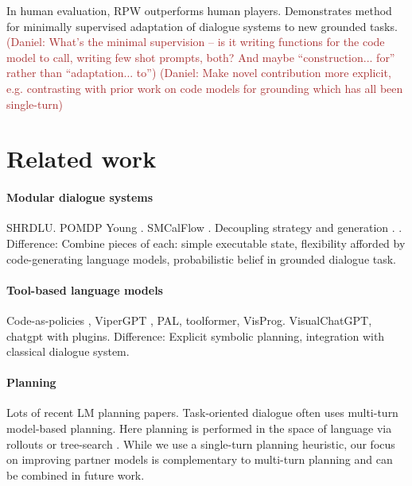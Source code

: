 \documentclass[11pt]{article}
\newcommand{\system}{RPW}
\newcommand{\daniel}[1]{{{\textcolor{brown}{(Daniel: #1)}}}}
\begin{document}
In human evaluation, \system{} outperforms human players.
Demonstrates method for minimally supervised adaptation of dialogue systems to new grounded tasks.
\daniel{What's the minimal supervision -- is it writing functions for the code model to call, writing few shot prompts, both? And maybe ``construction... for'' rather than ``adaptation... to''}
\daniel{Make novel contribution more explicit, e.g. contrasting with prior work on code models for grounding which has all been single-turn}

\section{Related work}

\paragraph{Modular dialogue systems}
SHRDLU. POMDP Young \citep{young2006pomdp}. SMCalFlow \citep{sm}.
Decoupling strategy and generation \citep{he2018dnd}. \citep{fstod}.
Difference: Combine pieces of each: simple executable state,
flexibility afforded by code-generating language models,
probabilistic belief in grounded dialogue task.

\paragraph{Tool-based language models}
Code-as-policies \citep{codeaspolicies2022}, ViperGPT \citep{vipergpt},
PAL, toolformer, VisProg.
VisualChatGPT, chatgpt with plugins.
Difference: Explicit symbolic planning,
integration with classical dialogue system.

\paragraph{Planning}
Lots of recent LM planning papers.
\citep{gandhi2023strategic}
Task-oriented dialogue often uses multi-turn model-based planning.
Here planning is performed in the space of language via rollouts or tree-search
\citep{dnd,yarats2017rollout,ingress,jang2020bapomdp}.
While we use a single-turn planning heuristic,
our focus on improving partner models is complementary to multi-turn planning and can be combined in future work.
\end{document}
